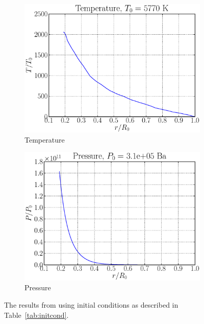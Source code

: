 \documentclass[a4paper, 11pt, english]{article}
\newcommand{\reftab}[1]{\textcolor{blue}{\ref{tab:#1}}} %
\begin{document}
\begin{figure}[htpb]
\begin{subfigure}{0.49\textwidth}
		\includegraphics[width=\linewidth]{figures/temperature_initial.eps}
		\caption{Temperature}
		\label{fig:temperature_init}
	\end{subfigure}\hfill
	\begin{subfigure}{0.49\textwidth}
		\includegraphics[width=\linewidth]{figures/pressure_initial.eps}
		\caption{Pressure}
		\label{fig:pressure_init}
	\end{subfigure}
	\vspace{0.2cm}
	\caption{The results from using initial conditions as described in
		Table~\reftab{initcond}.}
		\label{fig:init_results}
\end{figure}
\end{document}
